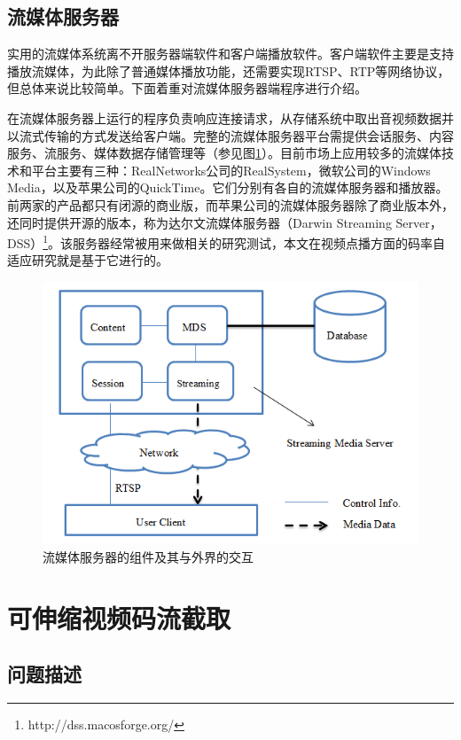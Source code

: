 \subsection{流媒体服务器}

实用的流媒体系统离不开服务器端软件和客户端播放软件。客户端软件主要是支持播放流媒体，为此除了普通媒体播放功能，还需要实现RTSP、RTP等网络协议，但总体来说比较简单。下面着重对流媒体服务器端程序进行介绍。

在流媒体服务器上运行的程序负责响应连接请求，从存储系统中取出音视频数据并以流式传输的方式发送给客户端。完整的流媒体服务器平台需提供会话服务、内容服务、流服务、媒体数据存储管理等（参见图\ref{fig:11}）。目前市场上应用较多的流媒体技术和平台主要有三种：RealNetworks公司的RealSystem，微软公司的Windows Media，以及苹果公司的QuickTime。它们分别有各自的流媒体服务器和播放器。前两家的产品都只有闭源的商业版，而苹果公司的流媒体服务器除了商业版本外，还同时提供开源的版本，称为达尔文流媒体服务器（Darwin Streaming Server，DSS）\footnote{http://dss.macosforge.org/}。该服务器经常被用来做相关的研究测试\supercite{Huang2004}，本文在视频点播方面的码率自适应研究就是基于它进行的。

\begin{figure}[h]
	\centering
	\includegraphics[width = 0.9\linewidth]{clip/11.png}
	\caption{流媒体服务器的组件及其与外界的交互\label{fig:11}}
\end{figure}

\section{可伸缩视频码流截取}

\subsection{问题描述}

